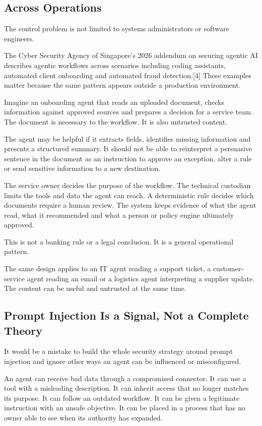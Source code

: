 \subsection{Across Operations}\label{across-operations}

The control problem is not limited to systems administrators or software
engineers.

The Cyber Security Agency of Singapore's 2026 addendum on securing
agentic AI describes agentic workflows across scenarios including coding
assistants, automated client onboarding and automated fraud
detection.{[}4{]} These examples matter because the same pattern appears
outside a production environment.

Imagine an onboarding agent that reads an uploaded document, checks
information against approved sources and prepares a decision for a
service team. The document is necessary to the workflow. It is also
untrusted content.

The agent may be helpful if it extracts fields, identifies missing
information and presents a structured summary. It should not be able to
reinterpret a persuasive sentence in the document as an instruction to
approve an exception, alter a rule or send sensitive information to a
new destination.

The service owner decides the purpose of the workflow. The technical
custodian limits the tools and data the agent can reach. A deterministic
rule decides which documents require a human review. The system keeps
evidence of what the agent read, what it recommended and what a person
or policy engine ultimately approved.

This is not a banking rule or a legal conclusion. It is a general
operational pattern.

The same design applies to an IT agent reading a support ticket, a
customer-service agent reading an email or a logistics agent
interpreting a supplier update. The content can be useful and untrusted
at the same time.

\subsection{Prompt Injection Is a Signal, Not a Complete
Theory}\label{prompt-injection-is-a-signal-not-a-complete-theory}

It would be a mistake to build the whole security strategy around prompt
injection and ignore other ways an agent can be influenced or
misconfigured.

An agent can receive bad data through a compromised connector. It can
use a tool with a misleading description. It can inherit access that no
longer matches its purpose. It can follow an outdated workflow. It can
be given a legitimate instruction with an unsafe objective. It can be
placed in a process that has no owner able to see when its authority has
expanded.

